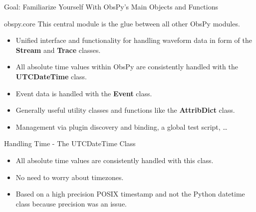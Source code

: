 \documentclass[handout]{beamer}
\begin{document}
\begin{frame}{}
    \begin{center}
        \textcolor{lmu@darkgreen}{\LARGE{Goal: Familiarize Yourself With ObsPy's Main Objects and Functions}}
    \end{center}
\end{frame}


\begin{frame}{obspy.core}
This central module is the glue between all other ObsPy modules.

    \begin{itemize}
        \item Unified interface and functionality for handling waveform data in
            form of the \textbf{Stream} and \textbf{Trace} classes.
        \item All absolute time values within ObsPy are consistently handled
            with the \textbf{UTCDateTime} class.
        \item Event data is handled with the \textbf{Event} class.
        \item Generally useful utility classes and functions like the
            \textbf{AttribDict} class.
        \item Management via plugin discovery and binding, a global test
            script, \ldots
    \end{itemize}
\end{frame}



\begin{frame}{Handling Time - The UTCDateTime Class}
    \begin{itemize}
        \item All absolute time values are consistently handled with this class.
        \item No need to worry about timezones.
        \item Based on a high precision POSIX timestamp and not the Python datetime class because precision was an issue.
    \end{itemize}
\end{frame}
\end{document}
